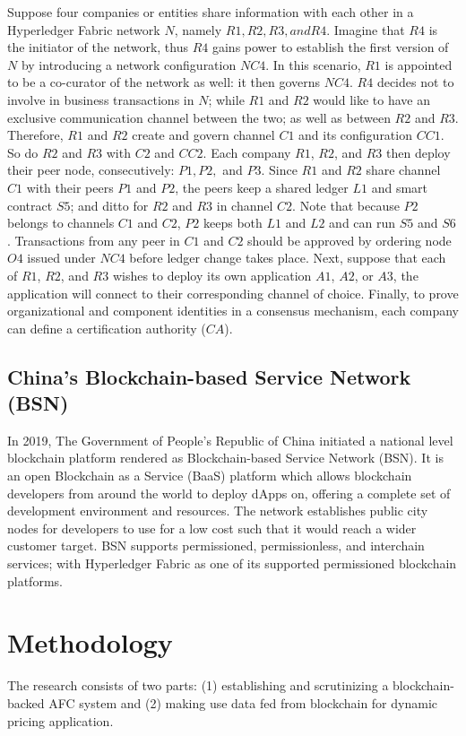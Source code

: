 \documentclass[a4paper,12pt,oneside, utf8x]{report}
\begin{document}
Suppose four companies or entities share information with each other in a Hyperledger Fabric network $N$, namely $R1, R2, R3, and R4$. Imagine that $R4$ is the initiator of the network, thus $R4$ gains power to establish the first version of $N$ by introducing a network configuration $NC4$. In this scenario, $R1$ is appointed to be a co-curator of the network as well: it then governs $NC4$. $R4$ decides not to involve in business transactions in $N$; while $R1$ and $R2$ would like to have an exclusive communication channel between the two; as well as between $R2$ and $R3$. Therefore, $R1$ and $R2$ create and govern channel $C1$ and its configuration $CC1$. So do $R2$ and $R3$ with $C2$ and $CC2$. Each company $R1$, $R2$, and $R3$ then deploy their peer node, consecutively: $P1, P2,$ and $P3$. Since $R1$ and $R2$ share channel $C1$ with their peers $P1$ and $P2$, the peers keep a shared ledger $L1$ and smart contract $S5$; and ditto for $R2$ and $R3$ in channel $C2$. Note that because $P2$ belongs to channels $C1$ and $C2$, $P2$ keeps both $L1$ and $L2$ and can run $S5$ and $S6$. Transactions from any peer in $C1$ and $C2$ should be approved by ordering node $O4$ issued under $NC4$ before ledger change takes place. Next, suppose that each of $R1$, $R2$, and $R3$ wishes to deploy its own application $A1$, $A2$, or $A3$, the application will connect to their corresponding channel of choice. Finally, to prove organizational and component identities in a consensus mechanism, each company can define a certification authority ($CA$).

\subsection{China’s Blockchain-based Service Network (BSN) \cite{a8,a27}}
In 2019, The Government of People’s Republic of China initiated a national level blockchain platform rendered as Blockchain-based Service Network (BSN). It is an open Blockchain as a Service (BaaS) platform which allows blockchain developers from around the world to deploy dApps on, offering a complete set of development environment and resources. The network establishes public city nodes for developers to use for a low cost such that it would reach a wider customer target. BSN supports permissioned, permissionless, and interchain services; with Hyperledger Fabric as one of its supported permissioned blockchain platforms.

\section{Methodology}
The research consists of two parts: (1) establishing and scrutinizing a blockchain-backed AFC system and (2) making use data fed from blockchain for dynamic pricing application.
\end{document}
